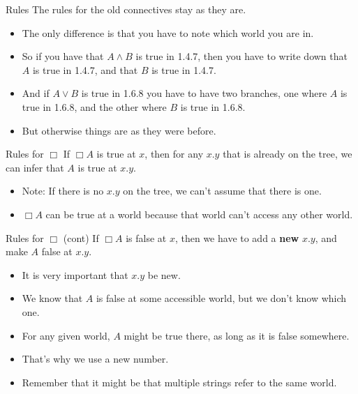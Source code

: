 \documentclass[
  ignorenonframetext,
]{beamer}
\providecommand{\tightlist}{%
  \setlength{\itemsep}{0pt}\setlength{\parskip}{0pt}}
\renewcommand{\,}{\text{, }}
\begin{document}
\begin{frame}{Rules}
\protect\hypertarget{rules}{}
The rules for the old connectives stay as they are.

\begin{itemize}
\tightlist
\item
  The only difference is that you have to note which world you are in.
\item
  So if you have that \(A \wedge B\) is true in 1.4.7, then you have to
  write down that \(A\) is true in 1.4.7, and that \(B\) is true in
  1.4.7.
\item
  And if \(A \vee B\) is true in 1.6.8 you have to have two branches,
  one where \(A\) is true in 1.6.8, and the other where \(B\) is true in
  1.6.8.
\item
  But otherwise things are as they were before.
\end{itemize}
\end{frame}

\begin{frame}{Rules for \(\Box\)}
\protect\hypertarget{rules-for-box}{}
If \(\Box A\) is true at \(x\), then for any \(x.y\) that is already on
the tree, we can infer that \(A\) is true at \(x.y\).

\begin{itemize}
\tightlist
\item
  Note: If there is no \(x.y\) on the tree, we can't assume that there
  is one.
\item
  \(\Box A\) can be true at a world because that world can't access any
  other world.
\end{itemize}
\end{frame}

\begin{frame}{Rules for \(\Box\) (cont)}
\protect\hypertarget{rules-for-box-cont}{}
If \(\Box A\) is false at \(x\), then we have to add a \textbf{new}
\(x.y\), and make \(A\) false at \(x.y\).

\begin{itemize}
\tightlist
\item
  It is very important that \(x.y\) be new.
\item
  We know that \(A\) is false at some accessible world, but we don't
  know which one.
\item
  For any given world, \(A\) might be true there, as long as it is false
  somewhere.
\item
  That's why we use a new number.
\item
  Remember that it might be that multiple strings refer to the same
  world.
\end{itemize}
\end{frame}
\end{document}

